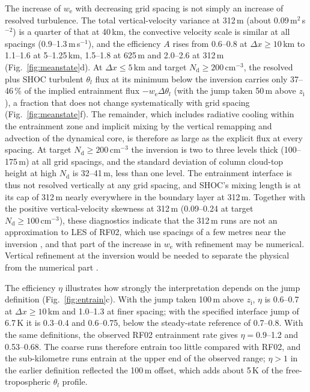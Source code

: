 \documentclass[acp, manuscript]{copernicus}
\newcommand{\Nd}{N_\mathrm{d}}
\newcommand{\we}{w_\mathrm{e}}
\newcommand{\zi}{z_\mathrm{i}}
\newcommand{\dx}{\Delta x}
\newcommand{\cmthree}{\mathrm{cm^{-3}}}
\begin{document}
The increase of $\we$ with decreasing grid spacing is not simply an increase of resolved turbulence. The total vertical-velocity variance at 312\,m (about 0.09\,m$^2$\,s$^{-2}$) is a quarter of that at 40\,km, the convective velocity scale is similar at all spacings (0.9--1.3\,m\,s$^{-1}$), and the efficiency $A$ rises from 0.6--0.8 at $\dx\geq10$\,km to 1.1--1.6 at 5--1.25\,km, 1.5--1.8 at 625\,m and 2.0--2.6 at 312\,m (Fig.~\ref{fig:meanstate}d). At $\dx\leq5$\,km and target $\Nd\geq200\,\cmthree$, the resolved plus SHOC turbulent $\theta_l$ flux at its minimum below the inversion carries only 37--46\,\% of the implied entrainment flux $-\we\Delta\theta_l$ (with the jump taken 50\,m above $\zi$), a fraction that does not change systematically with grid spacing (Fig.~\ref{fig:meanstate}f). The remainder, which includes radiative cooling within the entrainment zone and implicit mixing by the vertical remapping and advection of the dynamical core, is therefore as large as the explicit flux at every spacing. At target $\Nd\geq200\,\cmthree$ the inversion is two to three levels thick (100--175\,m) at all grid spacings, and the standard deviation of column cloud-top height at high $\Nd$ is 32--41\,m, less than one level. The entrainment interface is thus not resolved vertically at any grid spacing, and SHOC's mixing length is at its cap of 312\,m nearly everywhere in the boundary layer at 312\,m. Together with the positive vertical-velocity skewness at 312\,m (0.09--0.24 at target $\Nd\geq100\,\cmthree$), these diagnostics indicate that the 312\,m runs are not an approximation to LES of RF02, which use spacings of a few metres near the inversion \citep{ackerman2009}, and that part of the increase in $\we$ with refinement may be numerical. Vertical refinement at the inversion would be needed to separate the physical from the numerical part \citep{stevens1999res,bogenschutz2023rrm}.

The efficiency $\eta$ illustrates how strongly the interpretation depends on the jump definition (Fig.~\ref{fig:entrain}c). With the jump taken 100\,m above $\zi$, $\eta$ is 0.6--0.7 at $\dx\geq10$\,km and 1.0--1.3 at finer spacing; with the specified interface jump of 6.7\,K it is 0.3--0.4 and 0.6--0.75, below the steady-state reference of 0.7--0.8. With the same definitions, the observed RF02 entrainment rate gives $\eta=0.9$--1.2 and 0.53--0.68. The coarse runs therefore entrain too little compared with RF02, and the sub-kilometre runs entrain at the upper end of the observed range; $\eta>1$ in the earlier definition reflected the 100\,m offset, which adds about 5\,K of the free-tropospheric $\theta_l$ profile.
\end{document}
